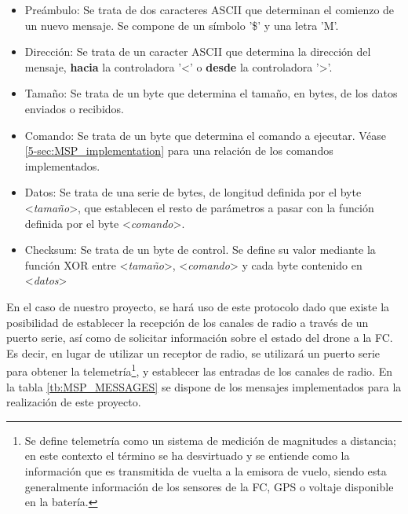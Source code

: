 \begin{itemize}
\item Preámbulo: Se trata de dos caracteres ASCII que determinan el comienzo de un nuevo mensaje. Se compone de un símbolo '\$' y una letra 'M'.
\item Dirección: Se trata de un caracter ASCII que determina la dirección del mensaje, \textbf{hacia} la controladora '<' o \textbf{desde} la controladora '>'.
\item Tamaño: Se trata de un byte que determina el tamaño, en bytes, de los datos enviados o recibidos.
\item Comando: Se trata de un byte que determina el comando a ejecutar. Véase \ref{5-sec:MSP_implementation} para una relación de los comandos implementados.
\item Datos: Se trata de una serie de bytes, de longitud definida por el byte <\textit{tamaño}>, que establecen el resto de parámetros a pasar con la función definida por el byte <\textit{comando}>.
\item Checksum: Se trata de un byte de control. Se define su valor mediante la función XOR entre <\textit{tamaño}>, <\textit{comando}> y cada byte contenido en <\textit{datos}>


\end{itemize}

En el caso de nuestro proyecto, se hará uso de este protocolo dado que existe la posibilidad de establecer la recepción de los canales de radio a través de un puerto serie, así como de solicitar información sobre el estado del drone a la FC. Es decir, en lugar de utilizar un receptor de radio, se utilizará un puerto serie para obtener la telemetría\footnote{Se define telemetría como un sistema de medición de magnitudes a distancia; en este contexto el término se ha desvirtuado y se entiende como la información que es transmitida de vuelta a la emisora de vuelo, siendo esta generalmente información de los sensores de la FC, GPS o voltaje disponible en la batería.}, y establecer las entradas de los canales de radio. 
En la tabla \ref{tb:MSP_MESSAGES} se dispone de los mensajes implementados para la realización de este proyecto. 


